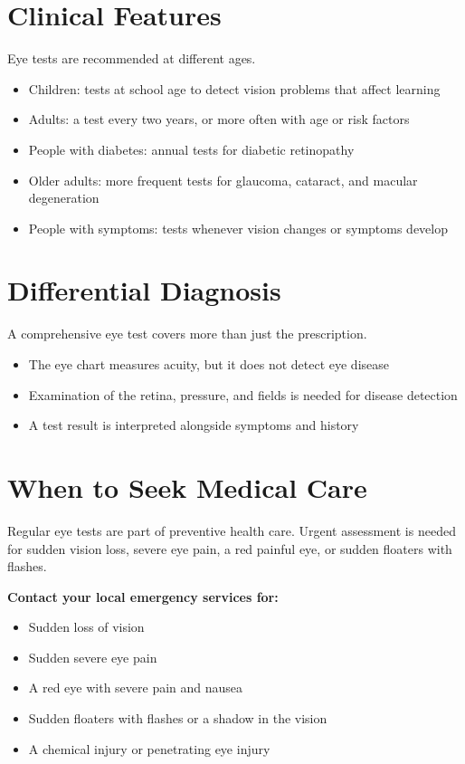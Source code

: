\section*{Clinical Features}
Eye tests are recommended at different ages.
\begin{itemize}
    \item Children: tests at school age to detect vision problems that affect learning
    \item Adults: a test every two years, or more often with age or risk factors
    \item People with diabetes: annual tests for diabetic retinopathy
    \item Older adults: more frequent tests for glaucoma, cataract, and macular degeneration
    \item People with symptoms: tests whenever vision changes or symptoms develop
\end{itemize}

\section*{Differential Diagnosis}
A comprehensive eye test covers more than just the prescription.
\begin{itemize}
    \item The eye chart measures acuity, but it does not detect eye disease
    \item Examination of the retina, pressure, and fields is needed for disease detection
    \item A test result is interpreted alongside symptoms and history
\end{itemize}

\section*{When to Seek Medical Care}
Regular eye tests are part of preventive health care. Urgent assessment is needed for sudden vision loss, severe eye pain, a red painful eye, or sudden floaters with flashes.

\textbf{Contact your local emergency services for:}
\begin{itemize}
    \item Sudden loss of vision
    \item Sudden severe eye pain
    \item A red eye with severe pain and nausea
    \item Sudden floaters with flashes or a shadow in the vision
    \item A chemical injury or penetrating eye injury
\end{itemize}


